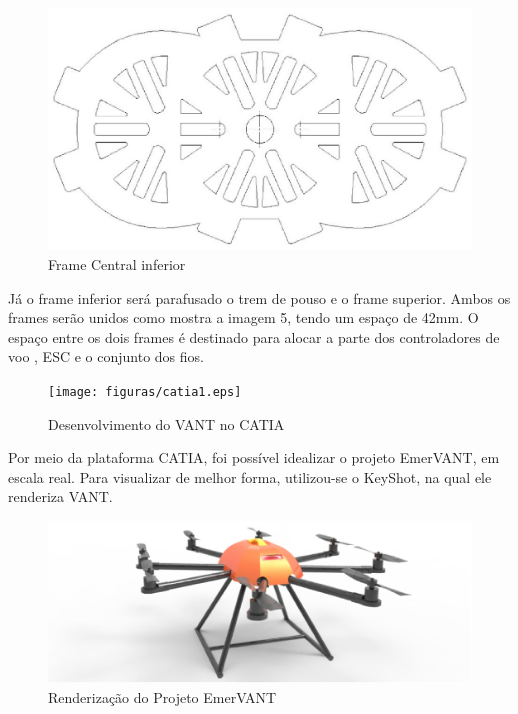 \begin{figure}[H]
    \centering
      \includegraphics[keepaspectratio=true,scale=0.5]{figuras/drawinfinfo.eps}
    \caption{ Frame Central inferior}
    \label{fig:drawinfinfo}
\end{figure}

Já o frame inferior será parafusado o trem de pouso e o frame superior. Ambos os frames serão unidos como mostra a imagem 5, tendo um espaço de 42mm. O espaço entre os dois frames é destinado para alocar a parte dos controladores de voo , ESC e o conjunto dos fios.

\begin{figure}[H]
    \centering
      \texttt{[image: figuras/catia1.eps]}
    \caption{Desenvolvimento do VANT no CATIA}
    \label{fig:catia1}
\end{figure}

Por meio da plataforma CATIA, foi possível idealizar o projeto EmerVANT, em escala real. Para visualizar de melhor forma, utilizou-se o KeyShot, na qual ele renderiza VANT.

\begin{figure}[H]
    \centering
      \includegraphics[keepaspectratio=true,scale=0.5]{figuras/keyshot1.eps}
    \caption{ Renderização do Projeto EmerVANT}
    \label{fig:keyshot1}
\end{figure}

